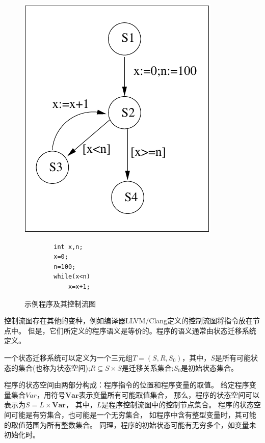 \begin{figure}[h]
	\begin{minipage}{.5\textwidth}
		\centering
		\includegraphics{figures/chap04/example1.pdf}
	\end{minipage}
	\begin{minipage}{.5\textwidth}
		\centering
		\begin{lstlisting}
		int x,n;
		x=0;
		n=100;
		while(x<n)
			x=x+1;
		\end{lstlisting}
	\end{minipage}
	\caption{示例程序及其控制流图}
	\label{fig-example}
\end{figure}


控制流图存在其他的变种，例如编译器LLVM/Clang定义的控制流图将指令放在节点中。
但是，它们所定义的程序语义是等价的。程序的语义通常由状态迁移系统定义。

\begin{definition}
一个状态迁移系统可以定义为一个三元组$T=(S, R, S_0)$，其中，$S$是所有可能状态的集合(也称为状态空间);$R \subseteq S \times S $是迁移关系集合;$S_0$是初始状态集合。
\end{definition}


程序的状态空间由两部分构成：程序指令的位置和程序变量的取值。
给定程序变量集合$Var$，用符号$\textbf{Var}$表示变量所有可能取值集合，
那么，程序的状态空间可以表示为$S = L \times \textbf{Var}$，
其中，$L$是程序控制流图中的控制节点集合。
程序的状态空间可能是有穷集合，也可能是一个无穷集合，
如程序中含有整型变量时，其可能的取值范围为所有整数集合。
同理，程序的初始状态可能有无穷多个，如变量未初始化时。

